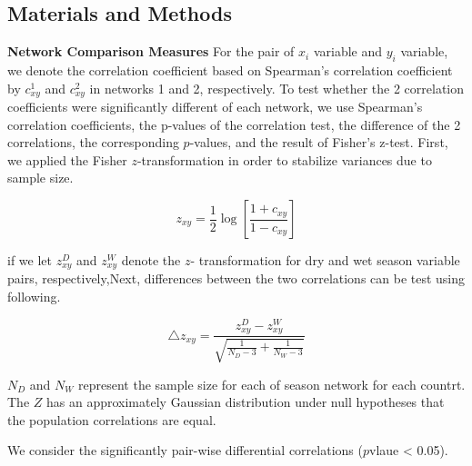 \subsection{Materials and Methods}

\textbf{Network Comparison Measures}
For the pair of $x_{i}$ variable and $y_{i}$ variable, we denote the correlation coefficient based on Spearman's correlation coefficient by $c_{xy}^1$ and $c_{xy}^2$ in networks 1 and 2, respectively. To test whether the 2 correlation coefficients were significantly different of each network, we use Spearman's correlation coefficients, the p-values of the correlation test, the difference of the 2 correlations, the corresponding $p$-values, and the result of Fisher's z-test. First, we applied the Fisher $z$-transformation in order to stabilize variances due to sample size.

\begin{equation}
z_{xy} = \frac{1}{2} \log\left[{\frac{1 + c_{xy}}{1 - c_{xy}}}\right]
\end{equation}

if we let $z_{xy}^D $ and $z_{xy}^W$ denote the $z$- transformation for dry and wet season variable pairs, respectively,Next, differences between the two correlations can be test using following. 

\begin{equation}
\triangle z_{xy} = \frac{z_{xy}^D - z_{xy}^W}{\sqrt{\frac{1}{N_{D}-3}+ \frac{1}{N_{W}-3}}}
\end{equation}

$N_{D}$ and $N_{W}$ represent the sample size for each of season network for each countrt. The $Z$ has an approximately Gaussian distribution under null hypotheses that the population correlations are equal.

We consider the significantly pair-wise differential correlations ($p$vlaue < 0.05).


 

